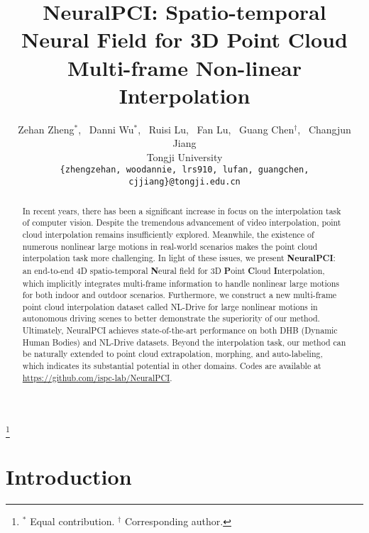 \documentclass[10pt,twocolumn,letterpaper]{article}
\begin{document}
\title{NeuralPCI: Spatio-temporal Neural Field for 3D Point Cloud Multi-frame Non-linear Interpolation}

\author{Zehan Zheng$^{\ast}$,~ Danni Wu$^{\ast}$,~ Ruisi Lu,~ Fan Lu,~ Guang Chen$^{\dagger}$,~ Changjun Jiang\\
Tongji University\\
{\tt\small \{zhengzehan, woodannie, lrs910, lufan, guangchen, cjjiang\}@tongji.edu.cn}}
\maketitle

\renewcommand{\thefootnote}{}
\footnote{$^\ast$ Equal contribution. $^\dagger$ Corresponding author.}


\vspace{-0.5cm}

\begin{abstract}
\vspace{-0.1cm}
In recent years, there has been a significant increase in focus on the interpolation task of computer vision. Despite the tremendous advancement of video interpolation, point cloud interpolation remains insufficiently explored. Meanwhile, the existence of numerous nonlinear large motions in real-world scenarios makes the point cloud interpolation task more challenging. In light of these issues, we present \textbf{NeuralPCI}: an end-to-end 4D spatio-temporal \textbf{N}eural field for 3D \textbf{P}oint \textbf{C}loud \textbf{I}nterpolation, which implicitly integrates multi-frame information to handle nonlinear large motions for both indoor and outdoor scenarios. Furthermore, we construct a new multi-frame point cloud interpolation dataset called NL-Drive for large nonlinear motions in autonomous driving scenes to better demonstrate the superiority of our method. Ultimately, NeuralPCI achieves state-of-the-art performance on both DHB (Dynamic Human Bodies) and NL-Drive datasets. Beyond the interpolation task, our method can be naturally extended to point cloud extrapolation, morphing, and auto-labeling, which indicates its substantial potential in other domains. Codes are available at \url{https://github.com/ispc-lab/NeuralPCI}.  

\end{abstract}

\vspace{-0.1cm}


\section{Introduction}
\label{sec:intro}
\end{document}
